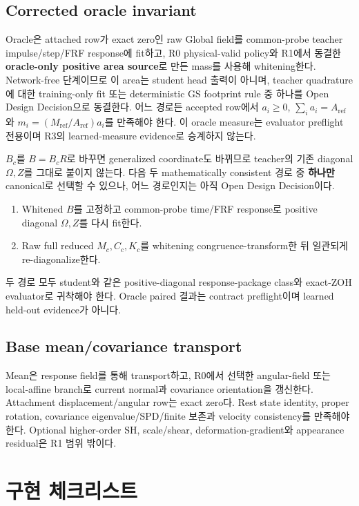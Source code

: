 \documentclass[10pt]{article}
\begin{document}
\subsection{Corrected oracle invariant}

Oracle은 attached row가 exact zero인 raw Global field를 common-probe teacher impulse/step/FRF response에 fit하고,
R0 physical-valid policy와 R1에서 동결한 \textbf{oracle-only positive area source}로 만든 mass를 사용해
whitening한다. Network-free 단계이므로 이 area는 student head 출력이 아니며, teacher quadrature에 대한
training-only fit 또는 deterministic GS footprint rule 중 하나를 Open Design Decision으로 동결한다.
어느 경로든 accepted row에서 \(a_i\ge0\), \(\sum_i a_i=A_{\mathrm{ref}}\)와
\(m_i=(M_{\mathrm{ref}}/A_{\mathrm{ref}})a_i\)를 만족해야 한다.
이 oracle measure는 evaluator preflight 전용이며 R3의 learned-measure evidence로 승계하지 않는다.

\(B_c\)를 \(B=B_cR\)로 바꾸면 generalized coordinate도 바뀌므로
teacher의 기존 diagonal \(\Omega,Z\)를 그대로 붙이지 않는다. 다음 두 mathematically consistent 경로 중
\textbf{하나만} canonical로 선택할 수 있으나, 어느 경로인지는 아직 Open Design Decision이다.
\begin{enumerate}
  \item Whitened \(B\)를 고정하고 common-probe time/FRF response로 positive diagonal \(\Omega,Z\)를 다시 fit한다.
  \item Raw full reduced \(M_c,C_c,K_c\)를 whitening congruence-transform한 뒤 일관되게 re-diagonalize한다.
\end{enumerate}
두 경로 모두 student와 같은 positive-diagonal response-package class와 exact-ZOH evaluator로 귀착해야 한다.
Oracle paired 결과는 contract preflight이며 learned held-out evidence가 아니다.

\subsection{Base mean/covariance transport}

Mean은 response field를 통해 transport하고, R0에서 선택한 angular-field 또는 local-affine branch로 current normal과
covariance orientation을 갱신한다. Attachment displacement/angular row는 exact zero다.
Rest state identity, proper rotation, covariance eigenvalue/SPD/finite 보존과 velocity consistency를 만족해야 한다.
Optional higher-order SH, scale/shear, deformation-gradient와 appearance residual은 R1 범위 밖이다.

\section{구현 체크리스트}
\label{sec:r1-chapter-4}
\label{sec:r1-implementation}
\end{document}
